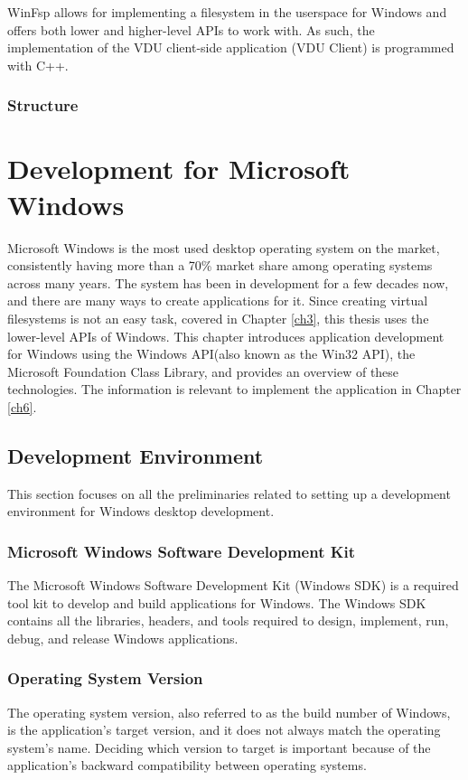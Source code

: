 WinFsp\cite{WinFsp} allows for implementing a filesystem in the userspace for Windows and offers both lower and higher-level APIs to work with. As such, the implementation of the VDU client-side application (VDU Client) is programmed with C++. 

\subsection*{Structure}

\chapter{Development for Microsoft Windows}
\label{ch2}

Microsoft Windows is the most used desktop operating system on the market, consistently having more than a 70\% market share among operating systems across many years\cite{DesktopOSStats}. The system has been in development for a few decades now, and there are many ways to create applications for it. Since creating virtual filesystems is not an easy task, covered in Chapter \ref{ch3}, this thesis uses the lower-level APIs of Windows. 
This chapter introduces application development for Windows using the Windows API(also known as the Win32 API), the Microsoft Foundation Class Library, and provides an overview of these technologies. The information is relevant to implement the application in Chapter \ref{ch6}.

\section{Development Environment}
This section focuses on all the preliminaries related to setting up a development environment for Windows desktop development.

\subsection*{Microsoft Windows Software Development Kit}
The Microsoft Windows Software Development Kit (Windows SDK) is a required tool kit to develop and build applications for Windows. The Windows SDK contains all the libraries, headers, and tools required to design, implement, run, debug, and release Windows applications.

\subsection*{Operating System Version}
The operating system version, also referred to as the build number of Windows, is the application's target version, and it does not always match the operating system's name. Deciding which version to target is important because of the application's backward compatibility between operating systems.\cite{OsVersion} 

